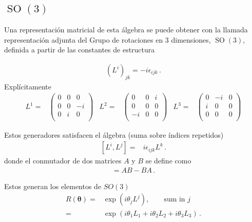 \subsection{$\operatorname{SO}(3)$}
Una representación matricial de esta álgebra se puede obtener con la llamada representación adjunta del Grupo de rotaciones en 3 dimensiones, $\operatorname{SO}(3)$, definida a partir de las constantes de estructura \cite{Veltman}
\begin{frame}
\begin{align}
  \label{eq:so3adj}
  (L^i)_{jk}=-i\epsilon_{ijk}\,.
\end{align}
Explícitamente
\begin{align*}
  L^1=&
  \begin{pmatrix}
   0 & 0 & 0\\
   0 & 0 & -i\\
   0 & i & 0 \\
  \end{pmatrix}&
 L^2=&
 \begin{pmatrix}
  0 & 0  & i \\ 
  0 & 0  & 0 \\
 -i & 0  & 0 \\
 \end{pmatrix}&
 L^3=&
 \begin{pmatrix}
   0 & -i & 0\\
   i & 0  & 0\\
   0 & 0 & 0\\
 \end{pmatrix}
\end{align*}

Estos generadores satisfacen el álgebra (suma sobre índices repetidos)
\begin{align}
  \left[ L^i,L^j \right]=& i \epsilon_{ijk}L^{k}\,.
\end{align}
donde el conmutador de dos matrices $A$ y $B$ se define como
\begin{align}
  [A,B]=AB-BA\,.
\end{align}
\end{frame}
Estos generan los elementos de $SO(3)$
\begin{align}
  R(\boldsymbol{\theta})=&\exp(i \theta_j L^{j}),\qquad\text{sum in $j$}\nonumber\\
                 =&\exp(i\theta_1 L_1+i\theta_2 L_2+i\theta_3 L_3)\,.
\end{align}

